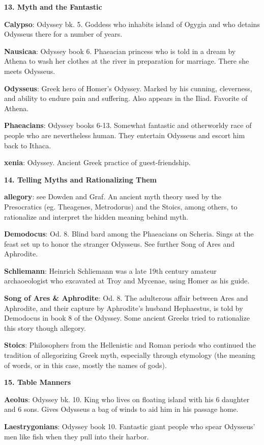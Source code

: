 \documentclass{scrartcl}
\begin{document}
\begin{multicols*}{3}
{\bf 13. Myth and the Fantastic}


{\bf Calypso}: Odyssey bk. 5. Goddess who inhabits island of Ogygia and who detains Odysseus there for a number of years.

{\bf Nausicaa}: Odyssey book 6. Phaeacian princess who is told in a dream by Athena to wash her clothes at the river in preparation for marriage. There she meets Odysseus.

{\bf Odysseus}: Greek hero of Homer's Odyssey. Marked by his cunning, cleverness, and ability to endure pain and suffering. Also appears in the Iliad. Favorite of Athena.

{\bf Phaeacians}: Odyssey books 6-13. Somewhat fantastic and otherworldy race of people who are nevertheless human. They entertain Odysseus and escort him back to Ithaca.

{\bf xenia}: Odyssey. Ancient Greek practice of guest-friendship.


{\bf 14. Telling Myths and Rationalizing Them}

{\bf allegory}: see Dowden and Graf. An ancient myth theory used by the Presocratics (eg. Theagenes, Metrodorus) and the Stoics, among others, to rationalize and interpret the hidden meaning behind myth.

{\bf Demodocus}: Od. 8. Blind bard among the Phaeacians on Scheria. Sings at the feast set up to honor the stranger Odysseus. See further Song of Ares and Aphrodite.

{\bf Schliemann}: Heinrich Schliemann was a late 19th century amateur archaoeologist who excavated at Troy and Mycenae, using Homer as his guide.

{\bf Song of Ares \& Aphrodite}: Od. 8. The adulterous affair between Ares and Aphrodite, and their capture by Aphrodite's husband Hephaestus, is told by Demodocus in book 8 of the Odyssey. Some ancient Greeks tried to rationalize this story though allegory.

{\bf Stoics}: Philosophers from the Hellenistic and Roman periods who continued the tradition of allegorizing Greek myth, especially through etymology (the meaning of words, or in this case, mostly the names of gods).


{\bf 15. Table Manners}

{\bf Aeolus}: Odyssey bk. 10. King who lives on floating island with his 6 daughter and 6 sons. Gives Odysseus a bag of winds to aid him in his passage home.

{\bf Laestrygonians}: Odyssey book 10. Fantastic giant people who spear Odysseus' men like fish when they pull into their harbor.


\end{multicols*}
\end{document}
